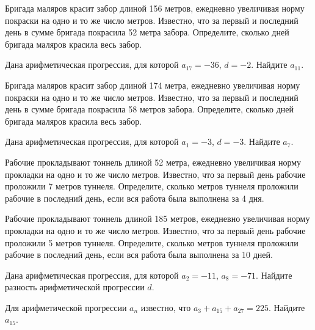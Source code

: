 \documentclass[4apaper]{article}
\begin{document}
\begin{taskBN}{62}
 Бригада маляров красит забор длиной 156 метров, ежедневно увеличивая норму покраски на одно и то же число метров. Известно, что за первый и последний день в сумме бригада покрасила 52 метра забора.  Определите, сколько дней бригада маляров красила весь забор. 
\end{taskBN}

\begin{taskBN}{63}
Дана арифметическая прогрессия, для которой $a_{17} = -36$, $d=-2$. Найдите $a_{11}$.
\end{taskBN}

\begin{taskBN}{64}
 Бригада маляров красит забор длиной 174 метра, ежедневно увеличивая норму покраски на одно и то же число метров. Известно, что за первый и последний день в сумме бригада покрасила 58 метров забора.  Определите, сколько дней бригада маляров красила весь забор. 
\end{taskBN}

\begin{taskBN}{65}
Дана арифметическая прогрессия, для которой $a_1 = -3$, $d=-3$. Найдите $a_{7}$.
\end{taskBN}

\begin{taskBN}{66}
 Рабочие прокладывают тоннель длиной 52 метра, ежедневно увеличивая норму прокладки на одно и то же число метров. Известно, что за первый день рабочие проложили 7 метров туннеля.  Определите, сколько метров туннеля проложили рабочие в последний день, если вся работа была выполнена за 4 дня.
\end{taskBN}

\begin{taskBN}{67}
 Рабочие прокладывают тоннель длиной 185 метров, ежедневно увеличивая норму прокладки на одно и то же число метров. Известно, что за первый день рабочие проложили 5 метров туннеля.  Определите, сколько метров туннеля проложили рабочие в последний день, если вся работа была выполнена за 10 дней.
\end{taskBN}

\begin{taskBN}{68}
Дана арифметическая прогрессия, для которой $a_{2} = -11$, $a_{8} = -71$. Найдите разность арифметической прогрессии $d$.
\end{taskBN}

\begin{taskBN}{69}
Для арифметической прогрессии ${a_n}$ известно, что $a_{3} + a_{15} + a_{27}= 225$. Найдите $a_{15}$.
\end{taskBN}
\end{document}
